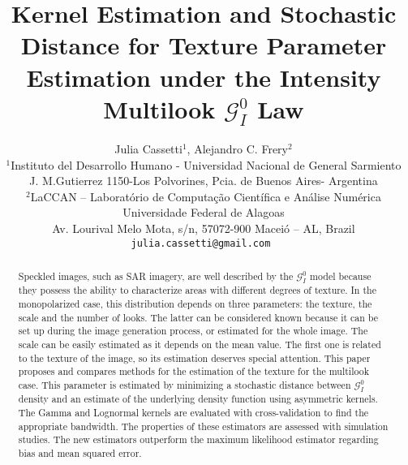 \documentclass[a4paper]{article} %
\date{} %
\begin{document}
\thispagestyle{empty}

\title{\textbf{Kernel Estimation and Stochastic Distance for Texture Parameter Estimation under the Intensity Multilook $\mathcal G_I^0$ Law}}

\author{Julia Cassetti{\small $^1$}, Alejandro C. Frery{\small $^2$}\\ %
	{\small $^1$Instituto del Desarrollo Humano -  Universidad Nacional de General Sarmiento} \\
	{\small J. M.Gutierrez 1150-Los Polvorines, Pcia. de Buenos Aires- Argentina}\\\small 
	$^2$LaCCAN -- Laborat\'orio de Computa\c c\~ao Cient\'ifica e An\'alise Num\'erica\\
	\small Universidade Federal de Alagoas\\
	\small Av. Lourival Melo Mota, s/n, 57072-900 Macei\'o -- AL, Brazil\\
	\tt{julia.cassetti@gmail.com} %
}%

\date{} %
\maketitle\thispagestyle{empty} %


\begin{abstract}
Speckled images, such as SAR imagery, are well described by the $\mathcal G_I^0$ model because they possess the ability to characterize areas with different degrees of texture. 
In the monopolarized case, this distribution depends on three parameters: the texture, the scale and the number of looks.
The latter can be considered known because it can be set up during the image generation process, or estimated for the whole image.
The scale can be easily estimated as it depends on the mean value.
The first one is related to the texture of the image, so its estimation deserves special attention.
This paper proposes and compares methods for the estimation of the texture for the multilook case. 
This parameter is estimated by minimizing a stochastic distance between $\mathcal G_I^0$ density and an estimate of the underlying density function using asymmetric kernels.
The Gamma and Lognormal kernels are evaluated with cross-validation to find the appropriate bandwidth.
The properties of these estimators are assessed with simulation studies. 
The new estimators outperform the maximum likelihood estimator regarding bias and mean squared error.
\end{abstract}
\end{document}
